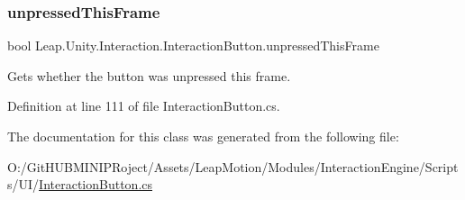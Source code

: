 \subsubsection{\texorpdfstring{unpressedThisFrame}{unpressedThisFrame}}
{\footnotesize\ttfamily bool Leap.\+Unity.\+Interaction.\+Interaction\+Button.\+unpressed\+This\+Frame\hspace{0.3cm}{\ttfamily [get]}}



Gets whether the button was unpressed this frame. 



Definition at line 111 of file Interaction\+Button.\+cs.



The documentation for this class was generated from the following file\+:\begin{DoxyCompactItemize}
\item 
O\+:/\+Git\+H\+U\+B\+M\+I\+N\+I\+P\+Roject/\+Assets/\+Leap\+Motion/\+Modules/\+Interaction\+Engine/\+Scripts/\+U\+I/\mbox{\hyperlink{_interaction_button_8cs}{Interaction\+Button.\+cs}}\end{DoxyCompactItemize}
